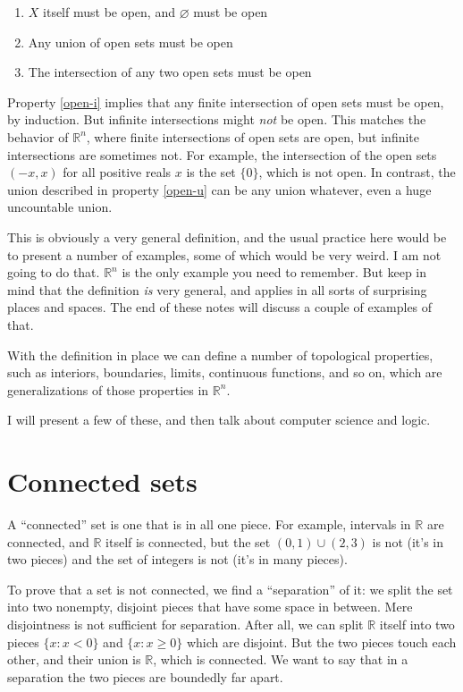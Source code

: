 \documentclass{article}
\def\R{{\mathbb R}}
\def\Rn{{\R^n}}
\begin{document}
\label{topology-def}
\begin{enumerate}
\item $X$ itself must be open, and $\varnothing$ must be open
\item \label{open-u} Any union of open sets must be open
\item \label{open-i} The intersection of any two open sets must be open
\end{enumerate}

Property \ref{open-i} implies that any finite intersection
of open sets must be open, by induction.  But infinite intersections
might {\em not\/} be open.  This matches the behavior of $\Rn$, where finite
intersections of open sets are open, but infinite intersections are
sometimes not.  For example, the intersection of the open sets $(-x,
x)$ for all positive reals $x$ is the set $\{0\}$, which is not
open.  In contrast, the union described in property \ref{open-u} can be any
union whatever, even a huge uncountable union.

This is obviously a very general definition, and the usual practice
here would be to present a number of examples, some of which would be
very weird.  I am not going to do that.  $\Rn$ is the only example you
need to remember.  But keep in mind that the definition {\em is\/}
very general, and applies in all sorts of surprising places and
spaces.  The end of these notes will discuss a couple of examples of that.

With the definition in place we can define a number of topological
properties, such as interiors, boundaries, limits, continuous
functions, and so on, which are generalizations of those properties in
$\Rn$.

I will present a few of these, and then talk about computer science
and logic.

\section*{Connected sets}

A ``connected'' set is one that is in all one piece.  For example,
intervals in $\R$ are connected, and $\R$ itself is connected, but the
set $(0,1)\cup(2,3)$ is not (it's in two pieces) and the set of
integers is not (it's in many pieces).

To prove that a set is not connected, we find a ``separation'' of it:
we split the set into two nonempty, disjoint pieces that have some
space in between.  Mere disjointness is not sufficient for separation.
After all, we can split $\R$ itself into two pieces $\{x : x<0\}$ and
$\{x : x\ge0\}$ which are disjoint. But the two pieces touch each
other, and their union is $\R$, which is connected.  We want to say
that in a separation the two pieces are boundedly far apart.
\end{document}
